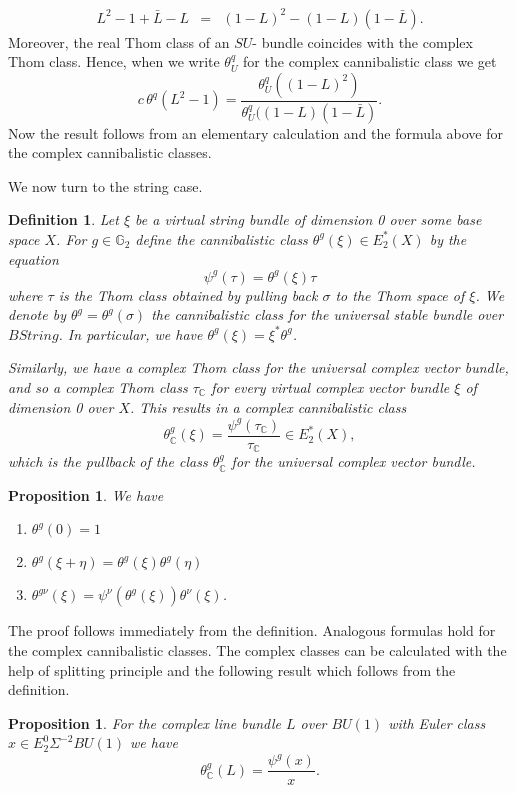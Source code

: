 \documentclass{amsart}
\newcommand {\C}{{\mathbb C}}
\newcommand {\G}{{\mathbb G}}
\numberwithin{equation}{section}
\newtheorem{defn}[thm]{Definition}
\newtheorem{prop}[thm]{Proposition}
\theoremstyle{definition}  %
\newenvironment{definition}{\begin{defn}\rm}{\end{defn}}
\newtheorem{set theory}[thm]{Set Theoretic Prelude}
\begin{document}
\begin{eqnarray}\label{su bdl}
 L^2-1+\bar{L}-L &=& (1-L)^2-(1-L)(1-\bar{L}).
 \end{eqnarray}
Moreover, the real Thom class of an $SU$- bundle coincides with the complex Thom class. Hence, when we write $\theta_U^q$ for the complex cannibalistic class we get
$$ c \, \theta^q(L^2-1)=\frac{\theta^q_U((1-L)^2)}{\theta_U^q((1-L)(1-\bar{L})}.$$
Now the result follows from an elementary calculation and the formula above for the complex cannibalistic classes. 
\par
We now turn to the string case.
\begin{definition} 
Let $\xi$ be a virtual string bundle of dimension 0 over some base space $X$. For $g \in \G_2$ define the cannibalistic class $\theta^g(\xi)\in E_2^*(X)$ by the equation
$$ \psi^g (\tau)=\theta^g (\xi) \tau $$
where $\tau$ is the Thom class obtained by pulling back $\sigma$ to the Thom space of $\xi$. 
We denote by ${\theta}^g=\theta^g(\sigma)$ the cannibalistic class for the universal stable bundle over $BString$.
In particular, we have $ \theta^g (\xi) = \xi^*{\theta}^g$.

Similarly, we have a complex Thom class for the universal complex vector bundle,
and so a complex Thom class $\tau_\C$ for every virtual complex vector bundle $\xi$ of dimension 0 over $X$.  This results in a complex cannibalistic class $$ \theta_\C^g (\xi)=\frac{\psi^g(\tau_\C)}{\tau_\C}\in E_2^*(X),$$ which is the pullback of the 
class $\theta_\C^g$ for the universal complex vector bundle.

\end{definition}
\begin{prop}\label{cannibalisticsum}
We have
\begin{enumerate}
\item
$\theta^g(0)=1$
\item 
$\theta^{g}(\xi +\eta)
=\theta^g (\xi )  \theta^g (\eta) 
$
\item 
$ \theta^{g \nu}(\xi) = \psi^\nu(\theta^g(\xi)) \theta^\nu (\xi)$.
\end{enumerate}

\end{prop}
The proof follows immediately from the definition. Analogous formulas hold for the complex cannibalistic classes. The complex classes can be calculated with the help of splitting principle and the following result which follows from the definition.
\begin{prop} For the complex line bundle $L$ over $BU(1)$ with Euler class $x\in E_2^0\Sigma^{-2}BU(1)$ we have 
$$ \theta_\C^{g}(L)=\frac{\psi^{g}(x)}{x}.$$

\end{prop}
\end{document}
